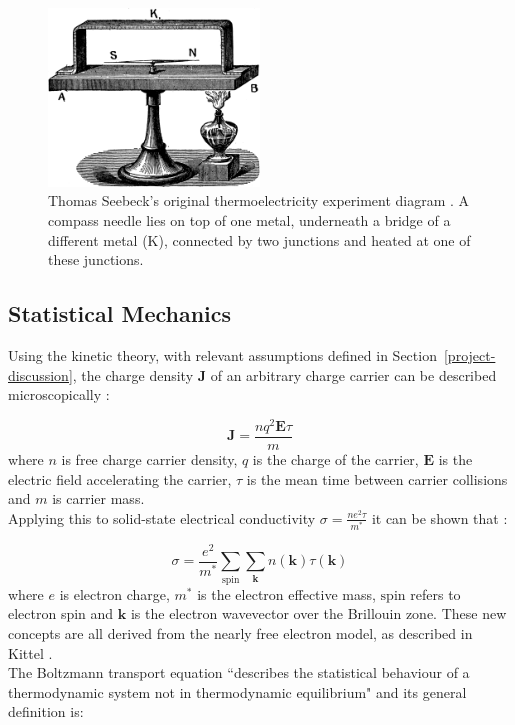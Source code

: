 \documentclass[a4paper,10pt,journal]{IEEEtran}
\newcommand{\secref}[2][Section~]{#1\ref{#2}}
\renewcommand{\vec}[1]{\mathbf{#1}}	%
\begin{document}
\begin{figure}
	\centering
	\includegraphics[width=0.5\textwidth]{seebeck-experiment-black.png}
	\caption{Thomas Seebeck's original thermoelectricity experiment
	diagram \cite{seebeck-original}. A compass needle lies on top of
	one metal, underneath a bridge of a different metal (K), connected
	by two junctions and heated at one of these junctions.}
	\label{seebeck-experiment}
\end{figure}

\subsection{Statistical Mechanics}
Using the kinetic theory, with relevant assumptions defined in \secref{project-discussion}, the charge density
$\vec{J}$ of an arbitrary charge carrier can be described
microscopically \cite{kittel}:

\begin{equation}
\label{charge-density}
	\vec{J} = \frac{nq^2\vec{E} \tau}{m}
\end{equation}
where $n$ is free charge carrier density, $q$ is the charge of the
carrier, $\vec{E}$ is the electric field accelerating the
carrier, $\tau$ is the mean time between carrier collisions and $m$ is
carrier mass.\\
Applying this to solid-state electrical conductivity $\sigma = \frac{ne^2
\tau}{m^*}$ it can be shown that \cite{ziman}:

\begin{equation}
\label{micro-elec}
	\sigma = \frac{e^2}{m^*} \sum_{\mathrm{spin}} \sum_{\vec{k}}
	n(\vec{k}) \tau(\vec{k})
\end{equation}
where $e$ is electron charge, $m^*$ is the electron effective mass, $\mathrm{spin}$ refers to
electron spin and $\vec{k}$ is the electron wavevector over the
Brillouin zone. These new concepts are all derived from the nearly free electron
model, as described in Kittel \cite{kittel}.\\
The Boltzmann transport equation ``describes the statistical behaviour
of a thermodynamic system not in thermodynamic equilibrium"
\cite{wiki-boltz} and its general definition is:
\end{document}
